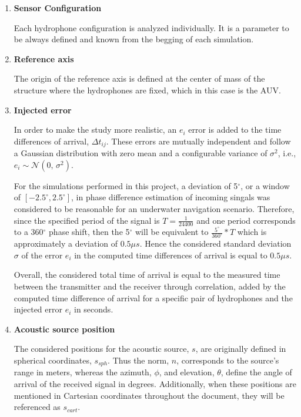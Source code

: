 \begin{enumerate}[label=\alph*)]
	\item \textbf{Sensor Configuration}  
	
	Each hydrophone configuration is analyzed individually. It is a parameter to be always defined and known from the begging of each simulation.
	
	\item \textbf{Reference axis}
	
	The origin of the reference axis is defined at the center of mass of the structure where the hydrophones are fixed, which in this case is the AUV.
	
	\item \textbf{Injected error} 
	
	In order to make the study more realistic, an $e_i$ error is added to the time differences of arrival, $ \Delta t_{ij}$. These errors are mutually independent and follow a Gaussian distribution with zero mean and a configurable variance of $\sigma^{2}$, i.e., $e_i \sim \mathcal{N}(0,\,\sigma^{2})$. 
	
	For the simulations performed in this project, a deviation of 5$^{\circ}$, or a window of $[-2.5^{\circ},2.5^{\circ}]$, in phase difference estimation of incoming singals was considered to be reasonable for an underwater navigation scenario. Therefore, since the specified period of the signal is $T = \frac{1}{24400}$ and one period corresponds to a 360$^{\circ}$ phase shift, then the 5$^{\circ}$ will be equivalent to $\frac{5^{\circ}}{360^{\circ}}*T$ which is approximately a deviation of $0.5\mu s$. Hence the considered standard deviation $\sigma$ of the error $e_i$ in the computed time differences of arrival is equal to $0.5\mu s$.
	
	Overall, the considered total time of arrival is equal to the measured time between the transmitter and the receiver through correlation, added by the computed time difference of arrival for a specific pair of hydrophones and the injected error $e_i$ in seconds.
	
	\item \textbf{Acoustic source position} 
	
	The considered positions for the acoustic source, $s$, are originally defined in spherical coordinates, $s_{sph}$. Thus the norm, $n$, corresponds to the source's range in meters, whereas the azimuth, $\phi$, and elevation, $\theta$, define the angle of arrival of the received signal in degrees. Additionally, when these positions are mentioned in Cartesian coordinates throughout the document, they will be referenced as $s_{cart}$.
	

\end{enumerate}
